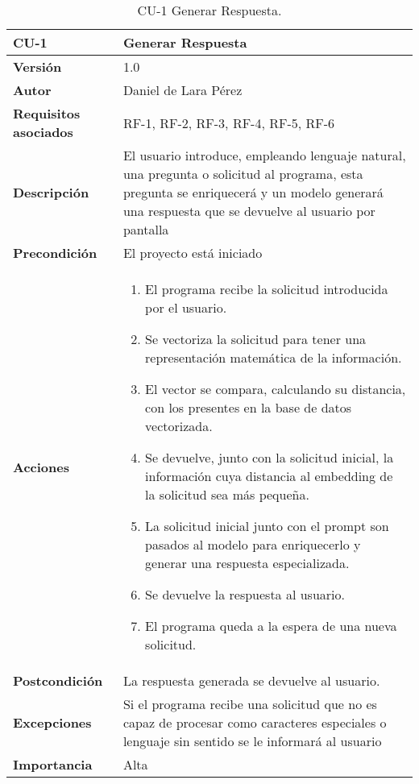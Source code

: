 \begin{table}[p]
	\centering
	\begin{tabularx}{\linewidth}{ p{} p{} }
		\toprule
		\textbf{CU-1}    & \textbf{Generar Respuesta}\\
		\toprule
		\textbf{Versión}              & 1.0    \\
		\textbf{Autor}                & Daniel de Lara Pérez \\
		\textbf{Requisitos asociados} & RF-1, RF-2, RF-3, RF-4, RF-5, RF-6 \\
		\textbf{Descripción}          & El usuario introduce, empleando lenguaje natural, una pregunta o solicitud al programa, esta pregunta se enriquecerá y un modelo generará una respuesta que se devuelve al usuario por pantalla \\
		\textbf{Precondición}         & El proyecto está iniciado \\
		\textbf{Acciones}             &
		\begin{enumerate}
			\def\labelenumi{\arabic{enumi}.}
			\tightlist
			\item El programa recibe la solicitud introducida por el usuario.
			\item Se vectoriza la solicitud para tener una representación matemática de la información.
   		\item El vector se compara, calculando su distancia, con los presentes en la base de datos vectorizada.
     	\item Se devuelve, junto con la solicitud inicial, la información cuya distancia al embedding de la solicitud sea más pequeña.
      	\item La solicitud inicial junto con el prompt son pasados al modelo para enriquecerlo y generar una respuesta especializada.
       	\item Se devuelve la respuesta al usuario.
        	\item El programa queda a la espera de una nueva solicitud.
         
		\end{enumerate}\\
		\textbf{Postcondición}        & La respuesta generada se devuelve al usuario. \\
		\textbf{Excepciones}          & Si el programa recibe una solicitud que no es capaz de procesar como caracteres especiales o lenguaje sin sentido se le informará al usuario \\
		\textbf{Importancia}          & Alta\\
		\bottomrule
	\end{tabularx}
	\caption{CU-1 Generar Respuesta.}
\end{table}

